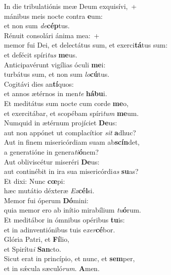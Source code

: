 \evenverse In die tribulatiónis meæ Deum exquisívi,~+\\\evenverse  mánibus meis nocte contra \textbf{e}um:~\*\\
\evenverse et non sum \textit{de}\textbf{cép}tus.\\
\oddverse Rénuit consolári ánima mea:~+\\
\oddverse  memor fui Dei, et delectátus sum, et exerci\textbf{tá}tus sum:~\*\\
\oddverse et defécit spíri\textit{tus} \textbf{me}us.\\
\evenverse Anticipavérunt vigílias óculi \textbf{me}i:~\*\\
\evenverse turbátus sum, et non sum \textit{lo}\textbf{cú}tus.\\
\oddverse Cogitávi dies an\textbf{tí}quos:~\*\\
\oddverse et annos ætérnos in men\textit{te} \textbf{há}\textbf{bu}i.\\
\evenverse Et meditátus sum nocte cum corde \textbf{me}o,~\*\\
\evenverse et exercitábar, et scopébam spíri\textit{tum} \textbf{me}um.\\
\oddverse Numquid in ætérnum projíciet \textbf{De}us:~\*\\
\oddverse aut non appónet ut complacítior \textit{sit} \textbf{a}dhuc?\\
\evenverse Aut in finem misericórdiam suam ab\textbf{scín}det,~\*\\
\evenverse a generatióne in genera\textit{ti}\textbf{ó}nem?\\
\oddverse Aut obliviscétur miseréri \textbf{De}us:~\*\\
\oddverse aut continébit in ira sua misericórdi\textit{as} \textbf{su}as?\\
\evenverse Et dixi: Nunc \textbf{cœ}pi:~\*\\
\evenverse hæc mutátio déxteræ \textit{Ex}\textbf{cél}si.\\
\oddverse Memor fui óperum \textbf{Dó}mini:~\*\\
\oddverse quia memor ero ab inítio mirabílium \textit{tu}\textbf{ó}rum.\\
\evenverse Et meditábor in ómnibus opéribus \textbf{tu}is:~\*\\
\evenverse et in adinventiónibus tuis e\textit{xer}\textbf{cé}bor.\\
\oddverse Glória Patri, et \textbf{Fí}lio,~\*\\
\oddverse et Spirítu\textit{i} \textbf{San}cto.\\
\evenverse Sicut erat in princípio, et nunc, et \textbf{sem}per,~\*\\
\evenverse et in sǽcula sæculó\textit{rum}. \textbf{A}men.\\
